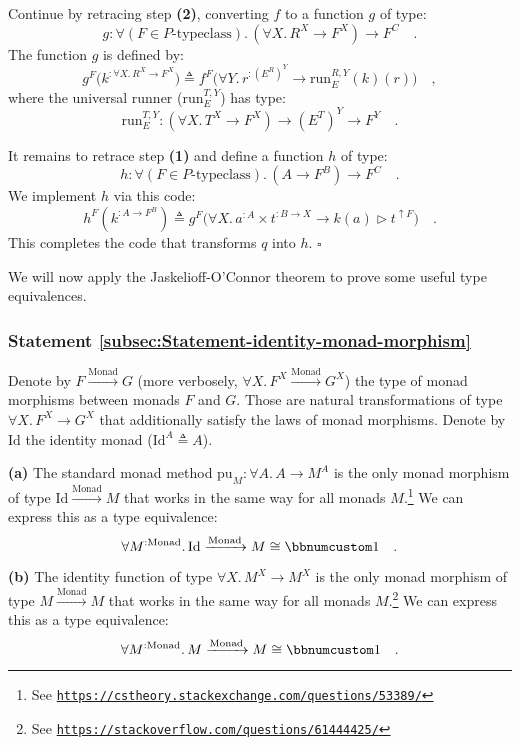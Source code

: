 Continue by retracing step \textbf{(2)}, converting $f$ to a function
$g$ of type:
\[
g:\forall(F\in P\text{-typeclass}).\,(\forall X.\,R^{X}\rightarrow F^{X})\rightarrow F^{C}\quad.
\]
The function $g$ is defined by:
\[
g^{F}\big(k^{:\forall X.\,R^{X}\rightarrow F^{X}}\big)\triangleq f^{F}\big(\forall Y.\,r^{:(E^{R})^{Y}}\rightarrow\text{run}_{E}^{R,Y}(k)(r)\big)\quad,
\]
where the universal runner ($\text{run}_{E}^{T,Y}$) has type:
\[
\text{run}_{E}^{T,Y}:(\forall X.\,T^{X}\rightarrow F^{X})\rightarrow(E^{T})^{Y}\rightarrow F^{Y}\quad.
\]

It remains to retrace step \textbf{(1)} and define a function $h$
of type:
\[
h:\forall(F\in P\text{-typeclass}).\,(A\rightarrow F^{B})\rightarrow F^{C}\quad.
\]
We implement $h$ via this code:
\[
h^{F}(k^{:A\rightarrow F^{B}})\triangleq g^{F}\big(\forall X.\,a^{:A}\times t^{:B\rightarrow X}\rightarrow k(a)\triangleright t^{\uparrow F}\big)\quad.
\]
This completes the code that transforms $q$ into $h$. $\square$

We will now apply the Jaskelioff-O\textsf{'}Connor theorem to prove some useful
type equivalences.

\subsubsection{Statement \label{subsec:Statement-identity-monad-morphism}\ref{subsec:Statement-identity-monad-morphism}}

Denote by $F\xrightarrow{\text{Monad}}G$ (more verbosely, $\forall X.\,F^{X}\xrightarrow{\text{Monad}}G^{X}$)
the type of monad morphisms between monads $F$ and $G$. Those are
natural transformations of type $\forall X.\,F^{X}\rightarrow G^{X}$
that additionally satisfy the laws of monad morphisms. Denote by $\text{Id}$
the identity monad ($\text{Id}^{A}\triangleq A$). 

\textbf{(a)} The standard monad method $\text{pu}_{M}:\forall A.\,A\rightarrow M^{A}$
is the only monad morphism of type $\text{Id}\xrightarrow{\text{Monad}}M$
that works in the same way for all monads $M$.\footnote{See \texttt{\href{https://cstheory.stackexchange.com/questions/53389/}{https://cstheory.stackexchange.com/questions/53389/}}}
We can express this as a type equivalence: 
\[
\forall M^{:\text{Monad}}.\,\text{Id}\xrightarrow{\text{Monad}}M\cong\bbnum 1\quad.
\]

\textbf{(b)} The identity function of type $\forall X.\,M^{X}\rightarrow M^{X}$
is the only monad morphism of type $M\xrightarrow{\text{Monad}}M$
that works in the same way for all monads $M$.\footnote{See \texttt{\href{https://stackoverflow.com/questions/61444425/}{https://stackoverflow.com/questions/61444425/}}}
We can express this as a type equivalence: 
\[
\forall M^{:\text{Monad}}.\,M\xrightarrow{\text{Monad}}M\cong\bbnum 1\quad.
\]


